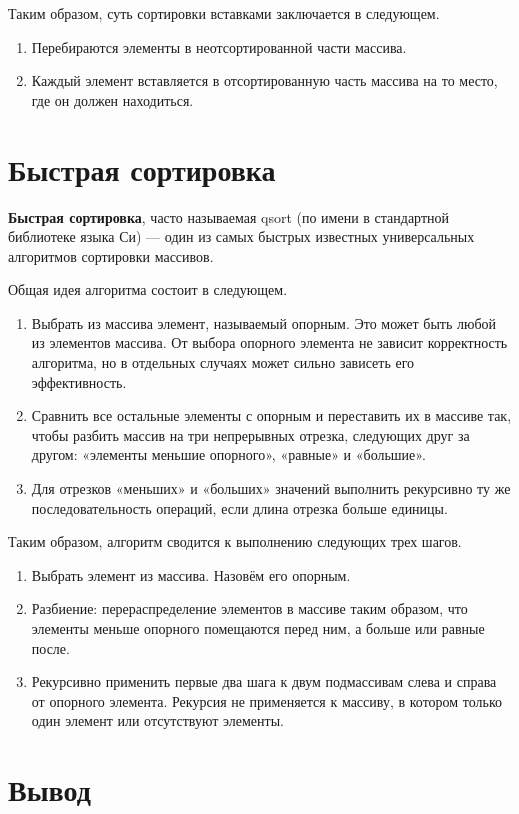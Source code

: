 \documentclass[12pt]{report}
\begin{document}
Таким образом, суть сортировки вставками заключается в следующем.
\begin{enumerate}
\item Перебираются элементы в неотсортированной части массива.
\item Каждый элемент вставляется в отсортированную часть массива на то место, где он должен находиться.
\end{enumerate}

\section{Быстрая сортировка}

\textbf{Быстрая сортировка}, часто называемая qsort (по имени в стандартной библиотеке языка Си) — один из самых быстрых известных универсальных алгоритмов сортировки массивов. 

Общая идея алгоритма состоит в следующем.

\begin{enumerate}
\item Выбрать из массива элемент, называемый опорным. Это может быть любой из элементов массива. От выбора опорного элемента не зависит корректность алгоритма, но в отдельных случаях может сильно зависеть его эффективность.
\item Сравнить все остальные элементы с опорным и переставить их в массиве так, чтобы разбить массив на три непрерывных отрезка, следующих друг за другом: «элементы меньшие опорного», «равные» и «большие».
\item Для отрезков «меньших» и «больших» значений выполнить рекурсивно ту же последовательность операций, если длина отрезка больше единицы.
\end{enumerate}

Таким образом, алгоритм сводится к выполнению следующих трех шагов.
\begin{enumerate}
\item Выбрать элемент из массива. Назовём его опорным.
\item Разбиение: перераспределение элементов в массиве таким образом, что элементы меньше опорного помещаются перед ним, а больше или равные после.
\item Рекурсивно применить первые два шага к двум подмассивам слева и справа от опорного элемента. Рекурсия не применяется к массиву, в котором только один элемент или отсутствуют элементы.
\end{enumerate}

\section{Вывод}
\end{document}
